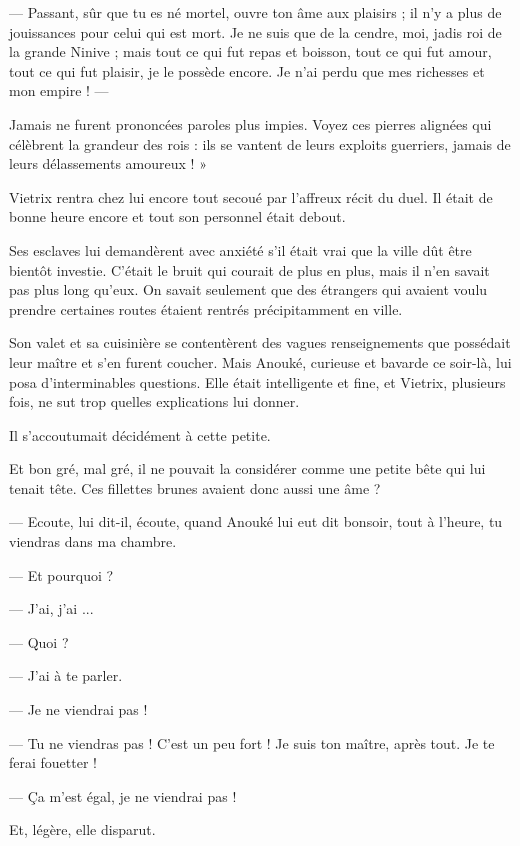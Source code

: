 \documentclass[a4paper, 11pt, oneside, polutonikogreek, french]{article}
\begin{document}
--- Passant, sûr que tu es né mortel, ouvre ton âme aux plaisirs ; il n'y a plus de jouissances pour celui qui est mort. Je ne suis que de la cendre, moi, jadis roi de la grande Ninive ; mais tout ce qui fut repas et boisson, tout ce qui fut amour, tout ce qui fut plaisir, je le possède encore. Je n'ai perdu que mes richesses et mon empire ! ---

Jamais ne furent prononcées paroles plus impies. Voyez ces pierres alignées qui célèbrent la grandeur des rois : ils se vantent de leurs exploits guerriers, jamais de leurs délassements amoureux ! »

\bigskip
\centerline{\EightStarTaper}
\centerline{\EightStarTaper\EightStarTaper}
\bigskip

Vietrix rentra chez lui encore tout secoué par l'affreux récit du duel. Il était de bonne heure encore et tout son personnel était debout.

Ses esclaves lui demandèrent avec anxiété s'il était vrai que la ville dût être bientôt investie. C'était le bruit qui courait de plus en plus, mais il n'en savait pas plus long qu'eux. On savait seulement que des étrangers qui avaient voulu prendre certaines routes étaient rentrés précipitamment en ville.

Son valet et sa cuisinière se contentèrent des vagues renseignements que possédait leur maître et s'en furent coucher. Mais Anouké, curieuse et bavarde ce soir-là, lui posa d'interminables questions. Elle était intelligente et fine, et Vietrix, plusieurs fois, ne sut trop quelles explications lui donner.

Il s'accoutumait décidément à cette petite.

Et bon gré, mal gré, il ne pouvait la considérer comme une petite bête qui lui tenait tête. Ces fillettes brunes avaient donc aussi une âme ?

--- Ecoute, lui dit-il, écoute, quand Anouké lui eut dit bonsoir, tout à l'heure, tu viendras dans ma chambre.

--- Et pourquoi ?

--- J'ai, j'ai ...

--- Quoi ?

--- J'ai à te parler.

--- Je ne viendrai pas !

--- Tu ne viendras pas ! C'est un peu fort ! Je suis ton maître, après tout. Je te ferai fouetter !

--- Ça m'est égal, je ne viendrai pas !

Et, légère, elle disparut.
\end{document}
